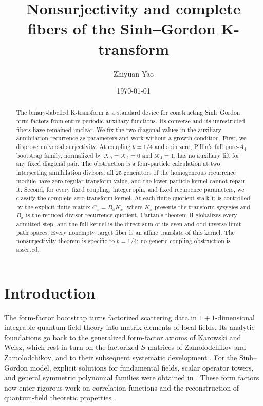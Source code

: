 \documentclass[11pt,reqno]{amsart}
\title[Nonsurjectivity and fibers of the Sinh--Gordon K-transform]{Nonsurjectivity and complete fibers of the Sinh--Gordon K-transform}
\author{Zhiyuan Yao}
\date{\today}
\theoremstyle{definition}
\theoremstyle{remark}
\newcommand{\cK}{\mathcal K}
\begin{document}
\begin{abstract}
The binary-labelled K-transform is a standard device for constructing
Sinh--Gordon form factors from entire periodic auxiliary functions.  Its
converse and its unrestricted fibers have remained unclear.  We fix the two
diagonal values in the auxiliary annihilation recurrence as parameters and
work without a growth condition.  First, we disprove universal surjectivity.
At coupling $b=1/4$ and spin zero, Pillin's full pure-$A_4$ bootstrap family,
normalized by $\cK_0=\cK_2=0$ and $\cK_4=1$, has no auxiliary lift for any
fixed diagonal pair.  The obstruction is a four-particle calculation at two
intersecting annihilation divisors: all 25 generators of the homogeneous
recurrence module have zero regular transform value, and the lower-particle
kernel cannot repair it.  Second, for every fixed coupling, integer spin, and
fixed recurrence parameters, we classify the complete zero-transform kernel.
At each finite quotient stalk it is controlled by the explicit finite matrix
$C_x=B_xK_x$, where $K_x$ presents the transform syzygies and $B_x$ is the
reduced-divisor recurrence quotient.  Cartan's theorem B globalizes every
admitted step, and the full kernel is the direct sum of its even and odd
inverse-limit path spaces.  Every nonempty target fiber is an affine translate
of this kernel.  The nonsurjectivity theorem is specific to $b=1/4$; no
generic-coupling obstruction is asserted.
\end{abstract}


\maketitle

\section{Introduction}
\label{sec:introduction}

The form-factor bootstrap turns factorized scattering data in
$1+1$-dimensional integrable quantum field theory into matrix elements of
local fields.  Its analytic foundations go back to the generalized form-factor
axioms of Karowski and Weisz, which rest in turn on the factorized
$S$-matrices of Zamolodchikov and Zamolodchikov, and to their subsequent
systematic development
\cite{Zamolodchikov_1979fs,Karowski_1978ef,Berg_1979co,Smirnov_1992}.  For the Sinh--Gordon model, explicit
solutions for fundamental fields, scalar operator towers, and general
symmetric polynomial families were obtained in
\cite{Fring_1993ff,Koubek_1993ot,Pillin_1998sg}.  These form factors now enter
rigorous work on correlation functions and the reconstruction of quantum-field
theoretic properties \cite{Kozlowski_2025om,Kozlowski_2025wa}.
\end{document}
